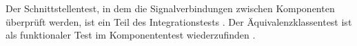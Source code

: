 Der Schnittstellentest, in dem die Signalverbindungen zwischen Komponenten überprüft werden, ist ein Teil des 
Integrationstests \parencite[S. 51, S. 217]{integration}.
Der Äquivalenzklassentest ist als funktionaler Test im Komponententest wiederzufinden \parencite[S. 41 f.]{integration}\parencite[S. 114 ff.]{equiinformatic}.

